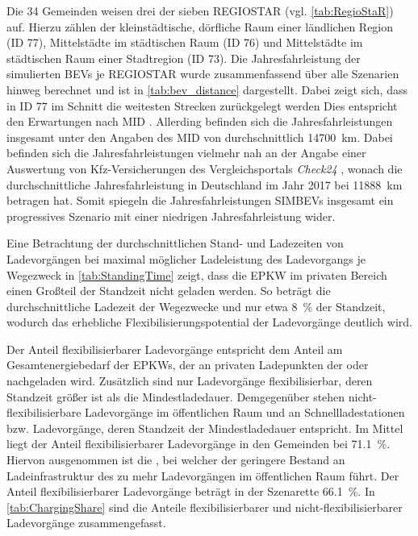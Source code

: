 Die \num{34} Gemeinden weisen drei der sieben \gls{REGIOSTAR} (vgl. \autoref{tab:RegioStaR}) auf.
Hierzu zählen der kleinstädtische, dörfliche Raum einer ländlichen Region (\gls{ID} \num{77}), Mittelstädte im städtischen Raum (\gls{ID} \num{76}) und Mittelstädte im städtischen Raum einer Stadtregion (\gls{ID} \num{73}).
Die Jahresfahrleistung der simulierten \glspl{BEV} je \gls{REGIOSTAR} wurde zusammenfassend über alle Szenarien hinweg berechnet und ist in \autoref{tab:bev_distance} dargestellt.
Dabei zeigt sich, dass in \gls{ID} \num{77} im Schnitt die weitesten Strecken zurückgelegt werden
Dies entspricht den Erwartungen nach \gls{MID} \cite{Nobis2019}.
Allerding befinden sich die Jahresfahrleistungen insgesamt unter den Angaben des \gls{MID} von durchschnittlich \SI{14700}{\km}.
Dabei befinden sich die Jahresfahrleistungen vielmehr nah an der Angabe einer Auswertung von Kfz-Versicherungen des Vergleichsportals \textit{Check24} \cite{CHECK24GmbH2018}, wonach die durchschnittliche Jahresfahrleistung in Deutschland im Jahr \num{2017} bei \SI{11888}{\km} betragen hat.
Somit spiegeln die Jahresfahrleistungen \glspl{SIMBEV} insgesamt ein progressives Szenario mit einer niedrigen Jahresfahrleistung wider.




Eine Betrachtung der durchschnittlichen Stand- und Ladezeiten von Ladevorgängen bei maximal möglicher Ladeleistung des Ladevorgangs je Wegezweck in \autoref{tab:StandingTime} zeigt, dass die \gls{EPKW} im privaten Bereich einen Großteil der Standzeit nicht geladen werden.
So beträgt die durchschnittliche Ladezeit der Wegezwecke \nH und \Arbeit nur etwa \SI{8}{\percent} der Standzeit, wodurch das erhebliche Flexibilisierungspotential der Ladevorgänge deutlich wird.



Der Anteil flexibilisierbarer Ladevorgänge entspricht dem Anteil am Gesamtenergiebedarf der \glspl{EPKW}, der an privaten Ladepunkten der \UCs \zH oder \Firmeparkplatz nachgeladen wird.
Zusätzlich sind nur Ladevorgänge flexibilisierbar, deren Standzeit größer ist als die Mindestladedauer.
Demgegenüber stehen nicht-flexibilisierbare Ladevorgänge im öffentlichen Raum und an Schnellladestationen bzw. Ladevorgänge, deren Standzeit der Mindestladedauer entspricht.
Im Mittel liegt der Anteil flexibilisierbarer Ladevorgänge in den Gemeinden bei \SI{71.1}{\percent}.
Hiervon ausgenommen ist die \SzeFirmenparkplatzdot, bei welcher der geringere Bestand an Ladeinfrastruktur des \UC \Firmeparkplatz zu mehr Ladevorgängen im öffentlichen Raum führt.
Der Anteil flexibilisierbarer Ladevorgänge beträgt in der Szenarette \SI{66.1}{\percent}.
In \autoref{tab:ChargingShare} sind die Anteile flexibilisierbarer und nicht-flexibilisierbarer Ladevorgänge zusammengefasst.

